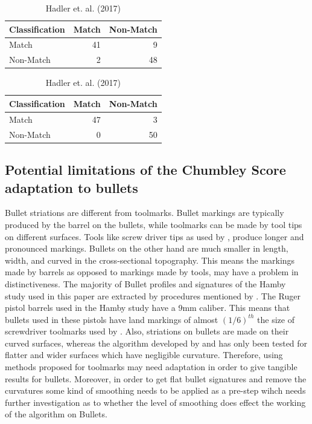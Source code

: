 \documentclass[12pt]{article}
\begin{document}
\begin{table}[!htb]
    \begin{minipage}{.5\linewidth}
      \caption{Chumbley et al. 2010}
      \centering 
\begin{tabular}{lrr}
\toprule
Classification & Match & Non-Match\\
\midrule
Match & 41 & 9\\
Non-Match & 2 & 48\\
\bottomrule
\end{tabular} \end{minipage}%
    \begin{minipage}{.5\linewidth}
      \centering
        \caption{Hadler et. al. (2017)} 
\begin{tabular}{lrr}
\toprule
Classification & Match & Non-Match\\
\midrule
Match & 47 & 3\\
Non-Match & 0 & 50\\
\bottomrule
\end{tabular} \end{minipage} 
\end{table}

\subsection{Potential limitations of the Chumbley Score adaptation to
bullets}\label{potential-limitations-of-the-chumbley-score-adaptation-to-bullets}

Bullet striations are different from toolmarks. Bullet markings are
typically produced by the barrel on the bullets, while toolmarks can be
made by tool tips on different surfaces. Tools like screw driver tips as
used by \citet{chumbley}, produce longer and pronounced markings.
Bullets on the other hand are much smaller in length, width, and curved
in the cross-sectional topography. This means the markings made by
barrels as opposed to markings made by tools, may have a problem in
distinctiveness. The majority of Bullet profiles and signatures of the
Hamby study \citep{hamby} used in this paper are extracted by procedures
mentioned by \citet{aoas}. The Ruger pistol barrels used in the Hamby
study have a 9mm caliber. This means that bullets used in these pistols
have land markings of almost \((1/6)^{th}\) the size of screwdriver
toolmarks used by \citet{chumbley}. Also, striations on bullets are made
on their curved surfaces, whereas the algorithm developed by
\citet{chumbley} and \citet{hadler} has only been tested for flatter and
wider surfaces which have negligible curvature. Therefore, using methods
proposed for toolmarks may need adaptation in order to give tangible
results for bullets. Moreover, in order to get flat bullet signatures
and remove the curvatures some kind of smoothing needs to be applied as
a pre-step wihch needs further investigation as to whether the level of
smoothing does effect the working of the algorithm on Bullets.
\end{document}
